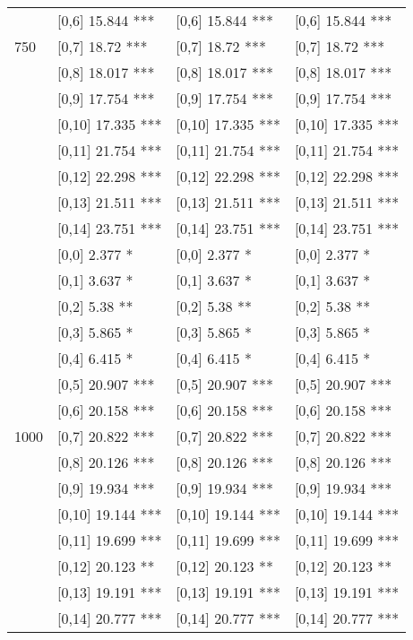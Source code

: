 \begin{table}
\begin{tabular}[t]{llll}
 & {}[0,6] 15.844 *** & {}[0,6] 15.844 *** & {}[0,6] 15.844 ***\\
750 & {}[0,7] 18.72 *** & {}[0,7] 18.72 *** & {}[0,7] 18.72 ***\\
 & {}[0,8] 18.017 *** & {}[0,8] 18.017 *** & {}[0,8] 18.017 ***\\
 & {}[0,9] 17.754 *** & {}[0,9] 17.754 *** & {}[0,9] 17.754 ***\\
\addlinespace
 & {}[0,10] 17.335 *** & {}[0,10] 17.335 *** & {}[0,10] 17.335 ***\\
 & {}[0,11] 21.754 *** & {}[0,11] 21.754 *** & {}[0,11] 21.754 ***\\
 & {}[0,12] 22.298 *** & {}[0,12] 22.298 *** & {}[0,12] 22.298 ***\\
 & {}[0,13] 21.511 *** & {}[0,13] 21.511 *** & {}[0,13] 21.511 ***\\
 & {}[0,14] 23.751 *** & {}[0,14] 23.751 *** & {}[0,14] 23.751 ***\\
\addlinespace
 & {}[0,0] 2.377 * & {}[0,0] 2.377 * & {}[0,0] 2.377 *\\
 & {}[0,1] 3.637 * & {}[0,1] 3.637 * & {}[0,1] 3.637 *\\
 & {}[0,2] 5.38 ** & {}[0,2] 5.38 ** & {}[0,2] 5.38 **\\
 & {}[0,3] 5.865 * & {}[0,3] 5.865 * & {}[0,3] 5.865 *\\
 & {}[0,4] 6.415 * & {}[0,4] 6.415 * & {}[0,4] 6.415 *\\
\addlinespace
 & {}[0,5] 20.907 *** & {}[0,5] 20.907 *** & {}[0,5] 20.907 ***\\
 & {}[0,6] 20.158 *** & {}[0,6] 20.158 *** & {}[0,6] 20.158 ***\\
1000 & {}[0,7] 20.822 *** & {}[0,7] 20.822 *** & {}[0,7] 20.822 ***\\
 & {}[0,8] 20.126 *** & {}[0,8] 20.126 *** & {}[0,8] 20.126 ***\\
 & {}[0,9] 19.934 *** & {}[0,9] 19.934 *** & {}[0,9] 19.934 ***\\
\addlinespace
 & {}[0,10] 19.144 *** & {}[0,10] 19.144 *** & {}[0,10] 19.144 ***\\
 & {}[0,11] 19.699 *** & {}[0,11] 19.699 *** & {}[0,11] 19.699 ***\\
 & {}[0,12] 20.123 ** & {}[0,12] 20.123 ** & {}[0,12] 20.123 **\\
 & {}[0,13] 19.191 *** & {}[0,13] 19.191 *** & {}[0,13] 19.191 ***\\
 & {}[0,14] 20.777 *** & {}[0,14] 20.777 *** & {}[0,14] 20.777 ***\\
\bottomrule
\end{tabular}
\end{table}
